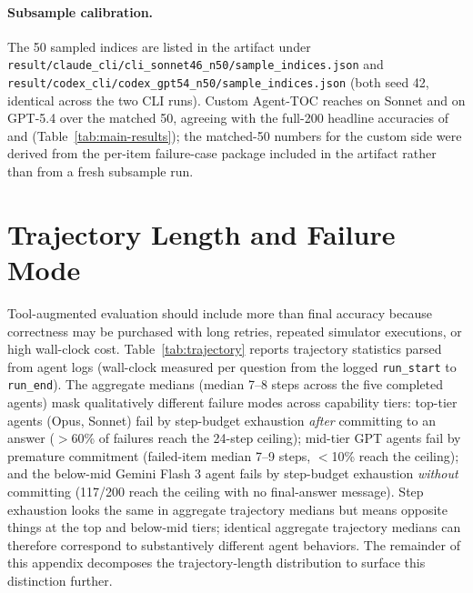 \documentclass{article}
\begin{document}
\paragraph{Subsample calibration.}
The 50 sampled indices are listed in the artifact under \texttt{result/claude\_cli/cli\_sonnet46\_n50/sample\_indices.json} and \texttt{result/codex\_cli/codex\_gpt54\_n50/sample\_indices.json} (both seed 42, identical across the two CLI runs). Custom Agent-TOC reaches \SDKCustomTOCAcc{} on Sonnet and \GPTFiveFourCustomTOCMatchedAcc{} on GPT-5.4 over the matched 50, agreeing with the full-200 headline accuracies of \SonnetTOC{} and \GPTFiveFourTOC{} (Table~\ref{tab:main-results}); the matched-50 numbers for the custom side were derived from the per-item failure-case package included in the artifact rather than from a fresh subsample run.

\section{Trajectory Length and Failure Mode}
\label{sec:appendix-trajectory}

Tool-augmented evaluation should include more than final accuracy because correctness may be purchased with long retries, repeated simulator executions, or high wall-clock cost. Table~\ref{tab:trajectory} reports trajectory statistics parsed from agent logs (wall-clock measured per question from the logged \texttt{run\_start} to \texttt{run\_end}). The aggregate medians (median 7--8 steps across the five completed agents) mask qualitatively different failure modes across capability tiers: top-tier agents (Opus, Sonnet) fail by step-budget exhaustion \emph{after} committing to an answer ($>$60\% of failures reach the 24-step ceiling); mid-tier GPT agents fail by premature commitment (failed-item median 7--9 steps, $<$10\% reach the ceiling); and the below-mid Gemini Flash 3 agent fails by step-budget exhaustion \emph{without} committing (117/200 reach the ceiling with no final-answer message). Step exhaustion looks the same in aggregate trajectory medians but means opposite things at the top and below-mid tiers; identical aggregate trajectory medians can therefore correspond to substantively different agent behaviors. The remainder of this appendix decomposes the trajectory-length distribution to surface this distinction further.
\end{document}
